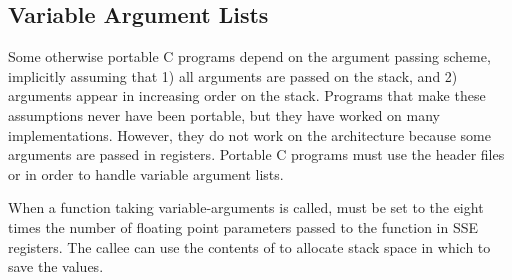 \subsection{Variable Argument Lists}

Some otherwise portable C programs depend on the argument passing
scheme, implicitly assuming that 1) all arguments are passed on the
stack, and 2) arguments appear in increasing order on the stack.
Programs that make these assumptions never have been portable, but
they have worked on many implementations. However, they do not work on
the \xARCH architecture because some arguments are passed in
registers.  Portable C programs must use the header files
 or  in order to handle variable
argument lists.

When a function taking variable-arguments is called,  must be
set to the eight times the number of floating point parameters passed
to the function in SSE registers.  The callee can use the contents of
 to allocate stack space in which to save the values.

